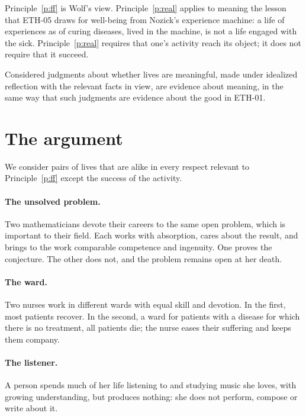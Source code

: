 \documentclass{situationist-preprint}
\begin{document}
Principle~\ref{p:ff} is Wolf's view. Principle~\ref{p:real} applies to meaning the lesson that ETH-05 draws for well-being from Nozick's experience machine: a life of experiences as of curing diseases, lived in the machine, is not a life engaged with the sick. Principle~\ref{p:real} requires that one's activity reach its object; it does not require that it succeed.

\begin{assumption}\label{a:refl}
Considered judgments about whether lives are meaningful, made under idealized reflection with the relevant facts in view, are evidence about meaning, in the same way that such judgments are evidence about the good in ETH-01.
\end{assumption}

\section{The argument}

We consider pairs of lives that are alike in every respect relevant to Principle~\ref{p:ff} except the success of the activity.

\paragraph{The unsolved problem.} Two mathematicians devote their careers to the same open problem, which is important to their field. Each works with absorption, cares about the result, and brings to the work comparable competence and ingenuity. One proves the conjecture. The other does not, and the problem remains open at her death.

\paragraph{The ward.} Two nurses work in different wards with equal skill and devotion. In the first, most patients recover. In the second, a ward for patients with a disease for which there is no treatment, all patients die; the nurse eases their suffering and keeps them company.

\paragraph{The listener.} A person spends much of her life listening to and studying music she loves, with growing understanding, but produces nothing: she does not perform, compose or write about it.
\end{document}
